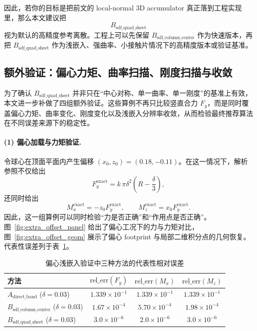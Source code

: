 \documentclass[12pt,a4paper]{ctexart}
\begin{document}
因此，若你的目标是把前文的 local-normal 3D accumulator 真正落到工程实现里，那么本文建议把
\begin{equation}
    B_{\mathrm{sdf\_quad\_sheet}}
\end{equation}
视为默认的高精度参考离散。工程上可以先保留 $B_{\mathrm{sdf\_column\_center}}$ 作为快速版本，再把 $B_{\mathrm{sdf\_quad\_sheet}}$ 作为浅嵌入、强曲率、小接触片情况下的高精度版本或验证基准。




\subsection{额外验证：偏心力矩、曲率扫描、刚度扫描与收敛}

为了确认 $B_{\mathrm{sdf\_quad\_sheet}}$ 并非只在“中心对称、单一曲率、单一刚度”的基准上有效，本文进一步补做了四组额外验证。这些算例不再只比较竖直合力 $F_y$，而是同时覆盖偏心力矩、曲率变化、刚度变化以及浅嵌入分辨率收敛，从而检验最终推荐算法在不同误差来源下的稳定性。

\paragraph{(1) 偏心加载与力矩验证.}
令球心在顶面平面内产生偏移 $(x_0,z_0)=(0.18,-0.11)$。在这一情况下，解析参照不仅给出
\begin{equation}
    F_y^{\mathrm{exact}} = k\,\pi\delta^2\left(R-\frac{\delta}{3}\right),
\end{equation}
还同时给出
\begin{equation}
    M_x^{\mathrm{exact}} = -z_0 F_y^{\mathrm{exact}},
    \qquad
    M_z^{\mathrm{exact}} = x_0 F_y^{\mathrm{exact}}.
\end{equation}
因此，这一组算例可以同时检验“力是否正确”和“作用点是否正确”。图~\ref{fig:extra_offset_panel} 给出了偏心工况下的力与力矩对比，图~\ref{fig:extra_offset_geom} 展示了偏心 footprint 与局部二维积分点的几何恢复。代表性误差列于表~\ref{tab:extra_offset}。

\begin{table}[H]
\centering
\caption{偏心浅嵌入验证中三种方法的代表性相对误差}
\label{tab:extra_offset}
\begin{tabular}{@{}>{\raggedright\arraybackslash}p{4.5cm}ccc@{}}
\toprule
方法 & $\mathrm{rel\_err}(F_y)$ & $\mathrm{rel\_err}(M_x)$ & $\mathrm{rel\_err}(M_z)$ \\
\midrule
$A_{\mathrm{direct\_band}}$ ($\delta=0.03$) & $1.339\times 10^{-1}$ & $1.339\times 10^{-1}$ & $1.339\times 10^{-1}$ \\
$B_{\mathrm{sdf\_column\_center}}$ ($\delta=0.03$) & $1.67\times 10^{-4}$ & $5.70\times 10^{-4}$ & $1.98\times 10^{-4}$ \\
$B_{\mathrm{sdf\_quad\_sheet}}$ ($\delta=0.03$) & $3.0\times 10^{-6}$ & $2.0\times 10^{-6}$ & $3.0\times 10^{-6}$ \\
\bottomrule
\end{tabular}
\end{table}
\end{document}
